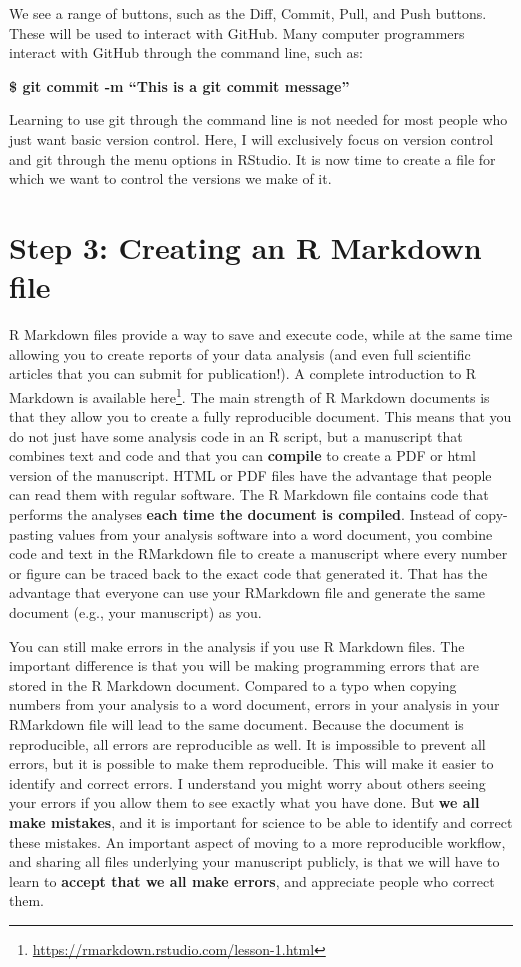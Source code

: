 \documentclass[
  oneside]{krantz}
\renewcommand{\href}[2]{#2\footnote{\url{#1}}}
\begin{document}
We see a range of buttons, such as the Diff, Commit, Pull, and Push buttons.
These will be used to interact with GitHub. Many computer programmers interact
with GitHub through the command line, such as:

\textbf{\$ git commit -m ``This is a git commit message''}

Learning to use git through the command line is not needed for most people who
just want basic version control. Here, I will exclusively focus on version
control and git through the menu options in RStudio. It is now time to create a
file for which we want to control the versions we make of it.

\hypertarget{step-3-creating-an-r-markdown-file}{%
\section{Step 3: Creating an R Markdown file}\label{step-3-creating-an-r-markdown-file}}

R Markdown files provide a way to save and execute code, while at the same time
allowing you to create reports of your data analysis (and even full scientific
articles that you can submit for publication!). A complete introduction to R
Markdown is \href{https://rmarkdown.rstudio.com/lesson-1.html}{available here}. The
main strength of R Markdown documents is that they allow you to create a fully
reproducible document. This means that you do not just have some analysis code
in an R script, but a manuscript that combines text and code and that you can
\textbf{compile} to create a PDF or html version of the manuscript. HTML or PDF files
have the advantage that people can read them with regular software. The R
Markdown file contains code that performs the analyses \textbf{each time the document
is compiled}. Instead of copy-pasting values from your analysis software into a
word document, you combine code and text in the RMarkdown file to create a
manuscript where every number or figure can be traced back to the exact code
that generated it. That has the advantage that everyone can use your RMarkdown
file and generate the same document (e.g., your manuscript) as you.

You can still make errors in the analysis if you use R Markdown files. The
important difference is that you will be making programming errors that are
stored in the R Markdown document. Compared to a typo when copying numbers from
your analysis to a word document, errors in your analysis in your RMarkdown file
will lead to the same document. Because the document is reproducible, all errors
are reproducible as well. It is impossible to prevent all errors, but it is
possible to make them reproducible. This will make it easier to identify and
correct errors. I understand you might worry about others seeing your errors if
you allow them to see exactly what you have done. But \textbf{we all make mistakes},
and it is important for science to be able to identify and correct these
mistakes. An important aspect of moving to a more reproducible workflow, and
sharing all files underlying your manuscript publicly, is that we will have to
learn to \textbf{accept that we all make errors}, and appreciate people who correct
them.
\end{document}
